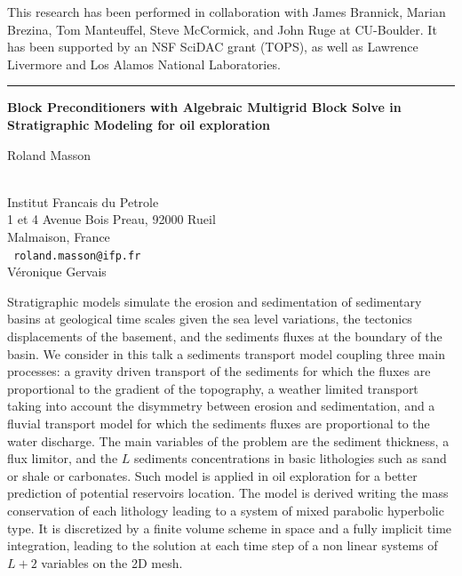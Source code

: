 \documentclass[twosided]{report}
\begin{document}
This research has been performed in collaboration with James Brannick,
Marian Brezina, Tom Manteuffel, Steve McCormick, and John Ruge at
CU-Boulder. It has been supported by an NSF SciDAC grant (TOPS), as
well as Lawrence Livermore and Los Alamos National Laboratories.

\begin{center}

\rule{6in}{1pt}
\end{center}

\begin{center}
{\large			\label{masson}
{\bf
Block Preconditioners with Algebraic Multigrid Block Solve in
Stratigraphic Modeling for oil exploration
}

Roland Masson} \\
Institut Francais du Petrole \\
1 et 4 Avenue Bois Preau, 92000 Rueil \\
Malmaison, France
\\ {\tt
roland.masson@ifp.fr
}
\\
V\'{e}ronique Gervais
\end{center}

Stratigraphic models simulate the erosion and sedimentation of
sedimentary basins at geological time scales given the sea level
variations, the tectonics displacements of the basement, and the
sediments fluxes at the boundary of the basin. We consider in this talk
a sediments transport model coupling three main processes: a gravity
driven transport of the sediments for which the fluxes are proportional
to the gradient of the topography, a weather limited transport taking
into account the disymmetry between erosion and sedimentation, and a
fluvial transport model for which the sediments fluxes are proportional
to the water discharge. The main variables of the problem are the
sediment thickness, a flux limitor, and the $L$ sediments concentrations
in basic lithologies such as sand or shale or carbonates. Such model is
applied in oil exploration for a better prediction of potential
reservoirs location. The model is derived writing the mass conservation
of each lithology leading to a system of mixed parabolic hyperbolic
type. It is discretized by a finite volume scheme in space and a fully
implicit time integration, leading to the solution at each time step of
a non linear systems of $L+2$ variables on the 2D mesh.
\end{document}
